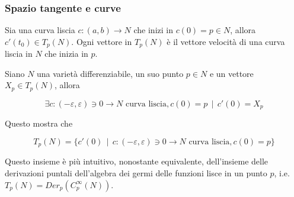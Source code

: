 \subsubsection{Spazio tangente e curve}

Sia una curva liscia $ c : (a,b) \to N $ che inizi in $ c(0) = p \in N $, allora $ c'(t_{0}) \in T_{p}(N) $. Ogni vettore in $ T_{p}(N) $ è il vettore velocità di una curva liscia in $ N $ che inizia in $ p $.

\begin{definition}
	Siano $ N $ una varietà differenziabile, un suo punto $ p \in N $ e un vettore $ X_{p} \in T_{p}(N) $, allora
	
	\begin{equation}
		\exists c : (-\varepsilon,\varepsilon) \ni 0 \to N \text{ curva liscia}, c(0) = p \, \mid \, c'(0) = X_{p}
	\end{equation}

	Questo mostra che
	
	\begin{equation}
		T_{p}(N) = \{ c'(0) \, \mid \, c : (-\varepsilon,\varepsilon) \ni 0 \to N \text{ curva liscia}, c(0) = p \}
	\end{equation}

	Questo insieme è più intuitivo, nonostante equivalente, dell'insieme delle derivazioni puntali dell'algebra dei germi delle funzioni lisce in un punto $ p $, i.e. $ T_{p}(N) = Der_{p}(C_{p}^{\infty}(N)) $.
\end{definition}

